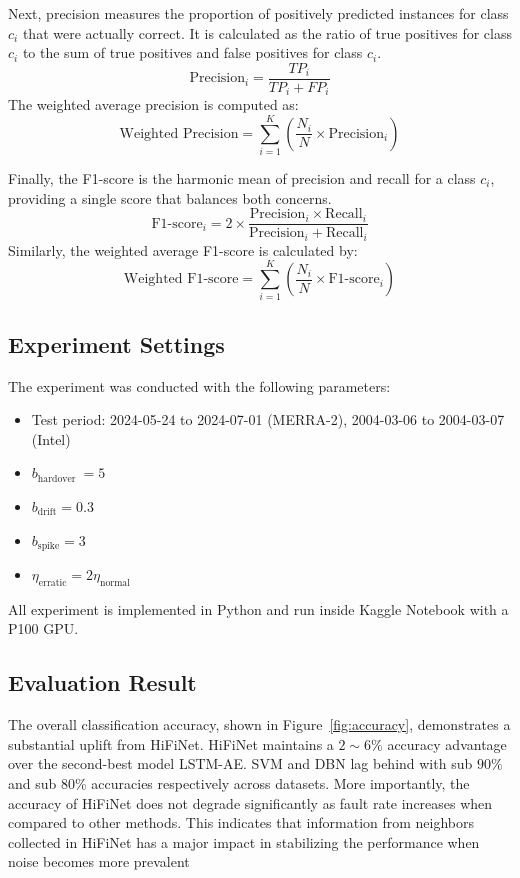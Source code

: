 Next, precision measures the proportion of positively predicted instances for class \(c_i\) that were actually correct. It is calculated as the ratio of true positives for class \(c_i\) to the sum of true positives and false positives for class \(c_i\).
\begin{equation}
  \text{Precision}_i = \frac{TP_i}{TP_i + FP_i}
\end{equation}
The weighted average precision is computed as:
\begin{equation}
  \text{Weighted Precision} = \sum_{i=1}^{K} \left( \frac{N_i}{N} \times \text{Precision}_i \right)
\end{equation}

Finally, the F1-score is the harmonic mean of precision and recall for a class \(c_i\), providing a single score that balances both concerns.
\begin{equation}
  \text{F1-score}_i = 2 \times \frac{\text{Precision}_i \times \text{Recall}_i}{\text{Precision}_i + \text{Recall}_i}
\end{equation}
Similarly, the weighted average F1-score is calculated by:
\begin{equation}
  \text{Weighted F1-score} = \sum_{i=1}^{K} \left( \frac{N_i}{N} \times \text{F1-score}_i \right)
\end{equation}

\subsection{Experiment Settings}
The experiment was conducted with the following parameters:
\begin{itemize}
  \item Test period: 2024-05-24 to 2024-07-01 (MERRA-2), 2004-03-06 to 2004-03-07 (Intel)
  \item \(b_\text{hardover}\ = 5\)
  \item \(b_\text{drift} = 0.3\)
  \item \(b_\text{spike} = 3\)
  \item \(\eta_\text{erratic} = 2\eta_\text{normal}\)
\end{itemize}

All experiment is implemented in Python and run inside Kaggle Notebook with a P100 GPU.

\subsection{Evaluation Result}
The overall classification accuracy, shown in Figure~\ref{fig:accuracy}, demonstrates a substantial uplift from HiFiNet. HiFiNet maintains a \(2\sim6\%\) accuracy advantage over the second-best model LSTM-AE. SVM and DBN lag behind with sub \(90\%\) and sub \(80\%\) accuracies respectively across datasets. More importantly, the accuracy of HiFiNet does not degrade significantly as fault rate increases when compared to other methods. This indicates that information from neighbors collected in HiFiNet has a major impact in stabilizing the performance when noise becomes more prevalent

